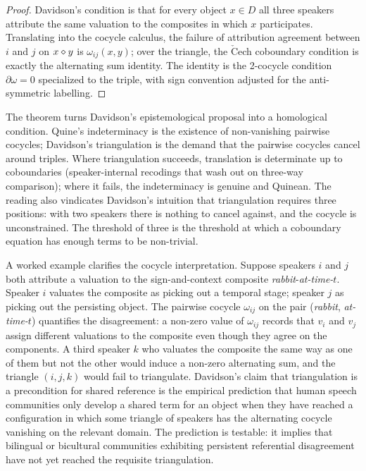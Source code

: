 \begin{proof}
Davidson's condition is that for every object $x\in D$ all three
speakers attribute the same valuation to the composites in which $x$
participates. Translating into the cocycle calculus, the failure of
attribution agreement between $i$ and $j$ on $x\mathbin{\diamond} y$ is
$\omega_{ij}(x,y)$; over the triangle, the $\check{\mathrm{C}}$ech
coboundary condition is exactly the alternating sum identity. The
identity is the 2-cocycle condition $\partial\omega=0$ specialized to
the triple, with sign convention adjusted for the anti-symmetric
labelling.
\end{proof}

The theorem turns Davidson's epistemological proposal into a
homological condition. Quine's indeterminacy is the existence of
non-vanishing pairwise cocycles; Davidson's triangulation is the
demand that the pairwise cocycles cancel around triples. Where
triangulation succeeds, translation is determinate up to coboundaries
(speaker-internal recodings that wash out on three-way comparison);
where it fails, the indeterminacy is genuine and Quinean. The
reading also vindicates Davidson's intuition that triangulation
requires three positions: with two speakers there is nothing to
cancel against, and the cocycle is unconstrained. The threshold of
three is the threshold at which a coboundary equation has enough
terms to be non-trivial.

A worked example clarifies the cocycle interpretation. Suppose
speakers $i$ and $j$ both attribute a valuation to the
sign-and-context composite \emph{rabbit}-\emph{at-time-$t$}. Speaker
$i$ valuates the composite as picking out a temporal stage; speaker
$j$ as picking out the persisting object. The pairwise cocycle
$\omega_{ij}$ on the pair (\emph{rabbit}, \emph{at-time-$t$})
quantifies the disagreement: a non-zero value of $\omega_{ij}$
records that $v_i$ and $v_j$ assign different valuations to the
composite even though they agree on the components. A third speaker
$k$ who valuates the composite the same way as one of them but not
the other would induce a non-zero alternating sum, and the triangle
$(i,j,k)$ would fail to triangulate. Davidson's claim that
triangulation is a precondition for shared reference is the empirical
prediction that human speech communities only develop a shared term
for an object when they have reached a configuration in which some
triangle of speakers has the alternating cocycle vanishing on the
relevant domain. The prediction is testable: it implies that bilingual
or bicultural communities exhibiting persistent referential
disagreement have not yet reached the requisite triangulation.

